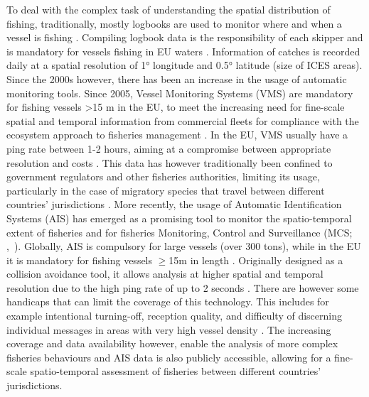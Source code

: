 To deal with the complex task of understanding the spatial distribution of fishing, traditionally,
mostly logbooks are used to monitor where and when a vessel is fishing \citep{HINTZEN201231}.
Compiling logbook data is the responsibility of each skipper and is mandatory for vessels fishing
in EU waters \citep{euregulation1993}. Information of catches is recorded daily at a spatial
resolution of 1° longitude and 0.5° latitude (size of ICES areas). Since the 2000s however, there
has been an increase in the usage of automatic monitoring tools. Since 2005, Vessel Monitoring
Systems (VMS) are mandatory for fishing vessels >15 m in the EU, to meet the increasing need for
fine-scale spatial and temporal information from commercial fleets for compliance with the
ecosystem approach to fisheries management \citep{ec2003regulation,gerritsen2010}. In the EU, VMS
usually have a ping rate between 1-2 hours, aiming at a compromise between appropriate resolution
and costs \citep{shepperson}. This data has however traditionally been confined to government
regulators and other fisheries authorities, limiting its usage, particularly in the case of
migratory species that travel between different countries' jurisdictions
\citep{orofino_transparency,confidentiality}. More recently, the usage of Automatic Identification
Systems (AIS) has emerged as a promising tool to monitor the spatio-temporal extent of fisheries
and for fisheries Monitoring, Control and Surveillance (MCS; \mbox{\citeauthor{zhang_ais_mcs},
	\citeyear{zhang_ais_mcs}}). Globally, AIS is compulsory for large vessels (over 300 tons), while in
the EU it is mandatory for fishing vessels $\ge$15m in length \citep{ec2011directive}. Originally
designed as a collision avoidance tool, it allows analysis at higher spatial and temporal
resolution due to the high ping rate of up to 2 seconds
\citep{taconet2019global,kontasvesselupdate}. There are however some handicaps that can limit the
coverage of this technology. This includes for example intentional turning-off, reception quality,
and difficulty of discerning individual messages in areas with very high vessel density
\citep{taconet2019global}. The increasing coverage and data availability however, enable the
analysis of more complex fisheries behaviours \citep{natale} and AIS data is also publicly
accessible, allowing for a fine-scale spatio-temporal assessment of fisheries between different
countries' jurisdictions.

\medskip

